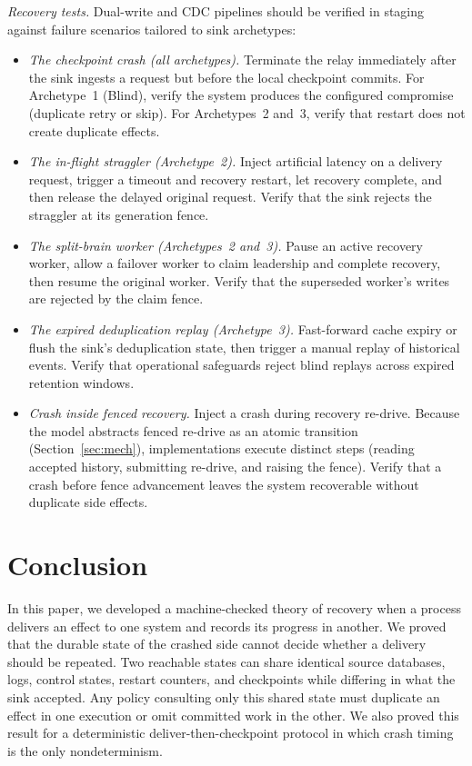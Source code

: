 \documentclass[sigplan,10pt]{acmart}
\theoremstyle{plain}
\theoremstyle{definition}
\begin{document}
\emph{Recovery tests.}
Dual-write and CDC pipelines should be verified in staging against failure
scenarios tailored to sink archetypes:
\begin{itemize}
\item \emph{The checkpoint crash (all archetypes).} Terminate the relay
  immediately after the sink ingests a request but before the local checkpoint
  commits. For Archetype~1 (Blind), verify the system produces the configured
  compromise (duplicate retry or skip). For Archetypes~2 and~3, verify that
  restart does not create duplicate effects.
\item \emph{The in-flight straggler (Archetype~2).} Inject artificial
  latency on a delivery request, trigger a timeout and recovery restart, let
  recovery complete, and then release the delayed original request. Verify
  that the sink rejects the straggler at its generation fence.
\item \emph{The split-brain worker (Archetypes~2 and~3).} Pause an active
  recovery worker, allow a failover worker to claim leadership
  and complete recovery, then resume the original worker.
  Verify that the superseded worker's writes are rejected by the claim fence.
\item \emph{The expired deduplication replay (Archetype~3).} Fast-forward cache
  expiry or flush the sink's deduplication state, then trigger a manual replay
  of historical events. Verify that operational safeguards reject blind
  replays across expired retention windows.
\item \emph{Crash inside fenced recovery.} Inject a crash during recovery
  re-drive. Because the model abstracts fenced re-drive as an atomic transition
  (Section~\ref{sec:mech}), implementations execute distinct steps (reading
  accepted history, submitting re-drive, and raising the fence). Verify that a
  crash before fence advancement leaves the system recoverable without
  duplicate side effects.
\end{itemize}

\section{Conclusion}\label{sec:conclusion}

In this paper, we developed a machine-checked theory of recovery when a
process delivers an effect to one system and records its progress in
another. We proved that the durable state of the crashed side cannot
decide whether a delivery should be repeated. Two reachable states can
share identical source databases, logs, control states, restart
counters, and checkpoints while differing in what the sink accepted. Any policy
consulting only this shared state must duplicate an effect in one
execution or omit committed work in the other. We also proved
this result for a deterministic deliver-then-checkpoint protocol in which
crash timing is the only nondeterminism.
\end{document}
